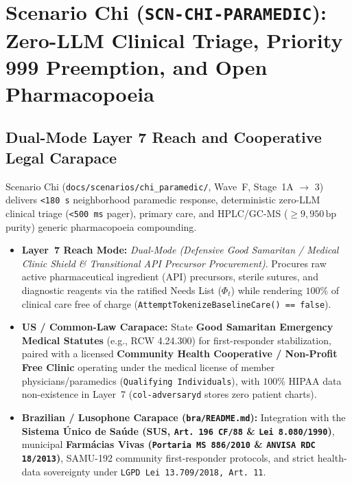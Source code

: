 \chapter{Scenario Chi (\texttt{SCN-CHI-PARAMEDIC}): Zero-LLM Clinical Triage, Priority 999 Preemption, and Open Pharmacopoeia}
\label{app:scenario-chi}

\section{Dual-Mode Layer 7 Reach and Cooperative Legal Carapace}
Scenario Chi (\texttt{docs/scenarios/chi\_paramedic/}, Wave~F, Stage~1A $\to$ 3) delivers \texttt{<180 s} neighborhood paramedic response, deterministic zero-LLM clinical triage (\texttt{<500 ms} pager), primary care, and HPLC/GC-MS ($\ge 9{,}950\,\mathrm{bp}$ purity) generic pharmacopoeia compounding.
\begin{itemize}
    \item \textbf{Layer~7 Reach Mode:} \textit{Dual-Mode (Defensive Good Samaritan / Medical Clinic Shield \& Transitional API Precursor Procurement)}. Procures raw active pharmaceutical ingredient (API) precursors, sterile sutures, and diagnostic reagents via the ratified Needs List ($\Phi_t$) while rendering $100\%$ of clinical care free of charge (\texttt{AttemptTokenizeBaselineCare() == false}).
    \item \textbf{US / Common-Law Carapace:} State \textbf{Good Samaritan Emergency Medical Statutes} (e.g., RCW 4.24.300) for first-responder stabilization, paired with a licensed \textbf{Community Health Cooperative / Non-Profit Free Clinic} operating under the medical license of member physicians/paramedics (\texttt{Qualifying Individuals}), with $100\%$ HIPAA data non-existence in Layer~7 (\texttt{col-adversaryd} stores zero patient charts).
    \item \textbf{Brazilian / Lusophone Carapace (\texttt{bra/README.md}):} Integration with the \textbf{Sistema {\'U}nico de Sa{\'u}de (SUS, \texttt{Art.~196 CF/88} \& \texttt{Lei 8.080/1990})}, municipal \textbf{Farm{\'a}cias Vivas (\texttt{Portaria MS 886/2010} \& \texttt{ANVISA RDC 18/2013})}, SAMU-192 community first-responder protocols, and strict health-data sovereignty under \texttt{LGPD Lei 13.709/2018, Art.~11}.
\end{itemize}

